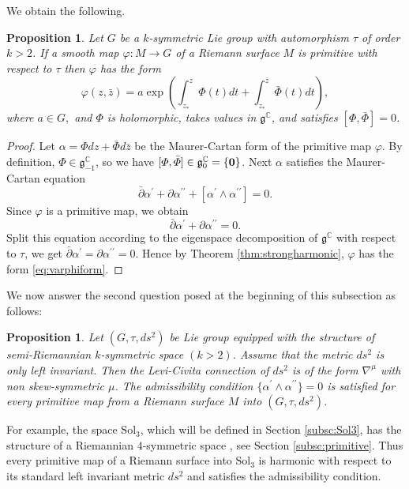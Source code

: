 \documentclass[12pt]{amsart}
\newtheorem{Proposition}[Theorem]{Proposition}
\theoremstyle{definition}
\theoremstyle{remark}
\numberwithin{equation}{section}
\begin{document}
 We obtain the following.
\begin{Proposition}
 Let $G$ be a $k$-symmetric Lie group with automorphism $\tau$ of order $k>2$. 
 If a smooth map $\varphi:M\to G$ of a Riemann surface
 $M$ is primitive with respect to $\tau$ then $\varphi$ has the form 
\begin{equation}\label{eq:varphiform}
 \varphi(z,\bar{z})=a \exp \left(\int_{z_*}^z \varPhi(t) dt
 +\int_{z_*}^{\bar z}\bar{\varPhi}(t) dt\right),
\end{equation}
 where $a\in G,$ and $\varPhi$ is holomorphic, takes 
 values in $\mathfrak g^{\mathbb C}$,
 and satisfies $[\varPhi,\bar \varPhi]=0$.
\end{Proposition}
\begin{proof}
 Let $\alpha = \varPhi dz + \bar \varPhi d\bar z$ be the Maurer-Cartan form of 
 the primitive map $\varphi$.
 By definition, $\varPhi\in \mathfrak{g}^{\mathbb C}_{-1}$, so we have 
 $[\varPhi,\bar \varPhi]\in \mathfrak{g}^{\mathbb C}_{0}=\{{\mbox{\boldmath ${0}$}}\}$.
 Next $\alpha$ satisfies the Maurer-Cartan equation
\begin{equation*}
\bar{\partial}\alpha^{\prime}+\partial \alpha^{\prime\prime}
+[\alpha^{\prime}\wedge \alpha^{\prime\prime}]=0.
\end{equation*}
Since $\varphi$ is a primitive map, we obtain 
\begin{equation*}
\bar{\partial}\alpha^{\prime}+\partial \alpha^{\prime\prime}=0.
\end{equation*}
 Split this equation according to the eigenspace decomposition 
 of $\mathfrak{g}^{\mathbb{C}}$ with respect to $\tau$, we get
 $\bar{\partial}\alpha^{\prime}=\partial \alpha^{\prime \prime}=0$.
 Hence by Theorem \ref{thm:strongharmonic}, $\varphi$ has the form 
 \eqref{eq:varphiform}. 
\end{proof}
 We now answer the second question posed at the beginning of this subsection as follows:
\begin{Proposition}
 Let $(G,\tau,ds^2)$ be Lie group equipped with the 
 structure of semi-Riemannian $k$-symmetric space $(k>2)$. Assume that 
 the metric $ds^2$ is only left invariant. Then the 
 Levi-Civita connection of $ds^2$ is of the form $\nabla^\mu$ with non skew-symmetric $\mu$. 
 The admissibility condition $\{\alpha^{\prime}\wedge \alpha^{\prime\prime}\}=0$ 
 is satisfied for every primitive map from a Riemann surface $M$ into $(G,\tau,ds^2)$.
\end{Proposition}
 For example, the space $\mathrm{Sol}_3$, which will be defined 
 in Section \ref{subsc:Sol3}, 
 has the structure of a Riemannian $4$-symmetric space \cite{Kowalski}, 
 see Section \ref{subsc:primitive}. 
 Thus every primitive map of a Riemann surface into $\mathrm{Sol}_3$ 
 is harmonic with respect to 
 its standard left invariant metric $ds^2$ and satisfies the admissibility condition. 
\end{document}
